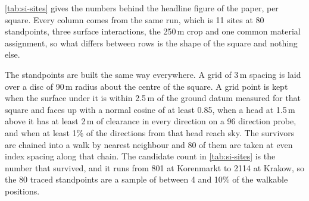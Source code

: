 \documentclass[journal]{IEEEtran}
\begin{document}
\cref{tab:si-sites} gives the numbers behind the headline figure of the paper,
per square. Every column comes from the same run, which is 11 sites at 80
standpoints, three surface interactions, the 250\,m crop and one common material
assignment, so what differs between rows is the shape of the square and nothing
else.

The standpoints are built the same way everywhere. A grid of 3\,m spacing is
laid over a disc of 90\,m radius about the centre of the square. A grid point is
kept when the surface under it is within 2.5\,m of the ground datum measured for
that square and faces up with a normal cosine of at least 0.85, when a head at
1.5\,m above it has at least 2\,m of clearance in every direction on a 96
direction probe, and when at least 1\% of the directions from that head reach
sky. The survivors are chained into a walk by nearest neighbour and 80 of them
are taken at even index spacing along that chain. The candidate count in
\cref{tab:si-sites} is the number that survived, and it runs from 801 at
Korenmarkt to 2114 at Krakow, so the 80 traced standpoints are a sample of
between 4 and 10\% of the walkable positions.
\end{document}
